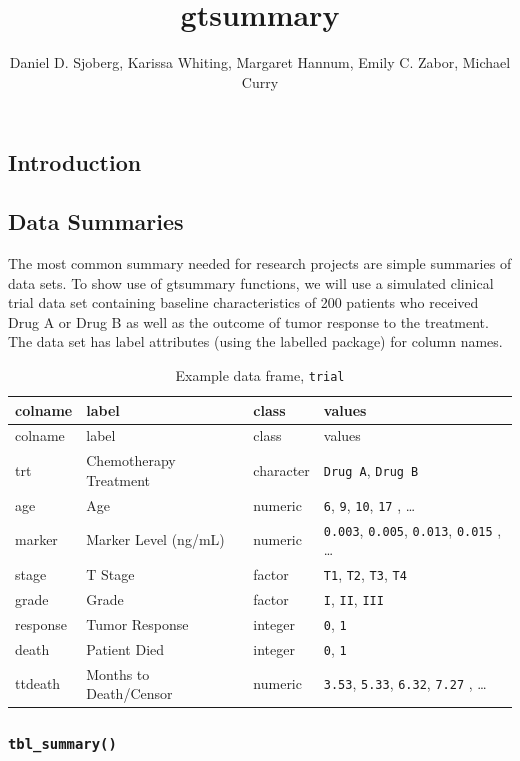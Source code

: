 \documentclass[
]{article}
\title{gtsummary}
\author{Daniel D. Sjoberg, Karissa Whiting, Margaret Hannum, Emily C.
Zabor, Michael Curry}
\date{}
\begin{document}
\maketitle

\hypertarget{introduction}{%
\subsection{Introduction}\label{introduction}}

\hypertarget{data-summaries}{%
\subsection{Data Summaries}\label{data-summaries}}

The most common summary needed for research projects are simple
summaries of data sets. To show use of gtsummary functions, we will use
a simulated clinical trial data set containing baseline characteristics
of 200 patients who received Drug A or Drug B as well as the outcome of
tumor response to the treatment. The data set has label attributes
(using the labelled package) for column names.

\begin{longtable}[]{@{}llll@{}}
\caption{Example data frame, \texttt{trial}}\tabularnewline
\toprule
colname & label & class & values\tabularnewline
\midrule
\endfirsthead
\toprule
colname & label & class & values\tabularnewline
\midrule
\endhead
trt & Chemotherapy Treatment & character & \texttt{Drug\ A},
\texttt{Drug\ B}\tabularnewline
age & Age & numeric & \texttt{6}, \texttt{9}, \texttt{10}, \texttt{17} ,
\ldots{}\tabularnewline
marker & Marker Level (ng/mL) & numeric & \texttt{0.003},
\texttt{0.005}, \texttt{0.013}, \texttt{0.015} , \ldots{}\tabularnewline
stage & T Stage & factor & \texttt{T1}, \texttt{T2}, \texttt{T3},
\texttt{T4}\tabularnewline
grade & Grade & factor & \texttt{I}, \texttt{II},
\texttt{III}\tabularnewline
response & Tumor Response & integer & \texttt{0},
\texttt{1}\tabularnewline
death & Patient Died & integer & \texttt{0}, \texttt{1}\tabularnewline
ttdeath & Months to Death/Censor & numeric & \texttt{3.53},
\texttt{5.33}, \texttt{6.32}, \texttt{7.27} , \ldots{}\tabularnewline
\bottomrule
\end{longtable}

\hypertarget{tbl_summary}{%
\subsubsection{\texorpdfstring{\texttt{tbl\_summary()}}{tbl\_summary()}}\label{tbl_summary}}
\end{document}
